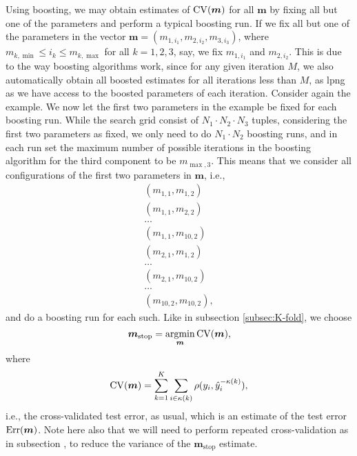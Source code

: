 Using boosting, we may obtain estimates of $\operatorname{CV}(\boldsymbol{m})$ for all $\boldsymbol{m}$ by fixing all but one of the parameters and perform a typical boosting run.
If we fix all but one of the parameters in the vector $\boldsymbol{m}=\left(m_{1,i_1},m_{2,i_2},m_{3,i_3}\right)$, where $m_{k,\min}\leq i_k\leq m_{k,\max}$ for all $k=1,2,3$, say, we fix $m_{1,i_1}$ and $m_{2,i_2}$.
This is due to the way boosting algorithms work, since for any given iteration $M$, we also automatically obtain all boosted estimates for all iterations less than $M$, as lpng as we have access to the boosted parameters of each iteration.
Consider again the example.
We now let the first two parameters in the example be fixed for each boosting run.
While the search grid consist of $N_1\cdot N_2\cdot N_3$ tuples, considering the first two parameters as fixed, we only need to do $N_1\cdot N_2$ boosting runs, and in each run set the maximum number of possible iterations in the boosting algorithm for the third component to be $m_{\max,3}$.
This means that we consider all configurations of the first two parameters in $\boldsymbol{m}$, i.e.,
\begin{align*}
    \left(m_{1,1},m_{1,2}\right) \\
    \left(m_{1,1},m_{2,2}\right) \\
    \ldots \\
    \left(m_{1,1},m_{10,2}\right) \\
    \left(m_{2,1},m_{1,2}\right) \\
    \ldots \\
    \left(m_{2,1},m_{10,2}\right) \\
    \ldots \\
    \left(m_{10,2},m_{10,2}\right),
\end{align*}
and do a boosting run for each such.
Like in subsection \ref{subsec:K-fold}, we choose
\begin{equation*}
    \boldsymbol{m}_{\text{stop}}=\operatorname*{argmin}_{\boldsymbol{m}}\operatorname{CV}(\boldsymbol{m}),
\end{equation*}
where
\begin{equation*}
    \operatorname{CV}(\boldsymbol{m})=\sum_{k=1}^K\sum_{i\in\kappa(k)}\rho(y_i,\hat{y}_i^{-\kappa(k)}),
\end{equation*}
i.e., the cross-validated test error, as usual, which is an estimate of the test error $\text{Err}(\boldsymbol{m})$.
Note here also that we will need to perform repeated cross-validation as in subsection \label{subsec:repeated-cv}, to reduce the variance of the $\boldsymbol{m}_{\text{stop}}$ estimate.

